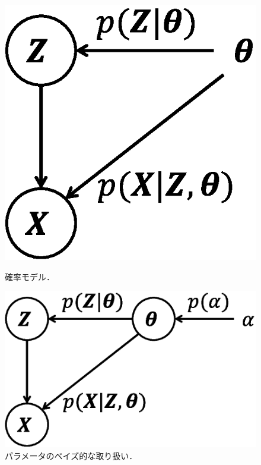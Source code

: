 \begin{figure}[t]
\centering
\begin{minipage}{.355\linewidth}
\centering
\includegraphics[width=.99\linewidth]{sections/optimization/model_ml}
\caption{確率モデル．}
\label{fig:model_ml}
\end{minipage}
\hspace{6pt}
\begin{minipage}{.56\linewidth}
\centering
\includegraphics[width=.99\linewidth]{sections/optimization/model_bayes}
\caption{パラメータのベイズ的な取り扱い．}
\label{fig:model_bayes}
\end{minipage}
\end{figure}

